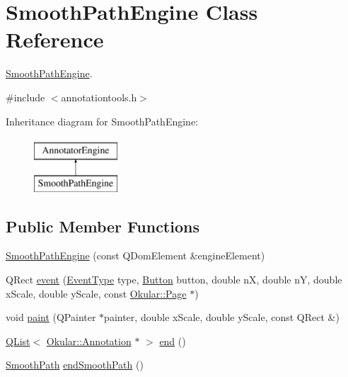 \hypertarget{classSmoothPathEngine}{\section{Smooth\+Path\+Engine Class Reference}
\label{classSmoothPathEngine}
}


\hyperlink{classSmoothPathEngine}{Smooth\+Path\+Engine}.  




{\ttfamily \#include $<$annotationtools.\+h$>$}

Inheritance diagram for Smooth\+Path\+Engine\+:\begin{figure}[H]
\begin{center}
\leavevmode
\includegraphics[height=2.000000cm]{classSmoothPathEngine}
\end{center}
\end{figure}
\subsection*{Public Member Functions}
\begin{DoxyCompactItemize}
\item 
\hyperlink{classSmoothPathEngine_a3d7f3b56a3f29fc0d2e144eb10f27635}{Smooth\+Path\+Engine} (const Q\+Dom\+Element \&engine\+Element)
\item 
Q\+Rect \hyperlink{classSmoothPathEngine_a7234a32a90d2784e2459cf838a37f172}{event} (\hyperlink{classAnnotatorEngine_a00fb22eb4cb6eafb056f9066031db133}{Event\+Type} type, \hyperlink{classAnnotatorEngine_ac2e3b75e12bacbb6974d15dd53954567}{Button} button, double n\+X, double n\+Y, double x\+Scale, double y\+Scale, const \hyperlink{classOkular_1_1Page}{Okular\+::\+Page} $\ast$)
\item 
void \hyperlink{classSmoothPathEngine_a08b94551c709ae56600afd692da10717}{paint} (Q\+Painter $\ast$painter, double x\+Scale, double y\+Scale, const Q\+Rect \&)
\item 
\hyperlink{classQList}{Q\+List}$<$ \hyperlink{classOkular_1_1Annotation}{Okular\+::\+Annotation} $\ast$ $>$ \hyperlink{classSmoothPathEngine_aa1dd0f64bab0f5d94aba93557a6ba328}{end} ()
\item 
\hyperlink{classSmoothPath}{Smooth\+Path} \hyperlink{classSmoothPathEngine_aa029e01d4c38d701466498fc7c222133}{end\+Smooth\+Path} ()
\end{DoxyCompactItemize}
